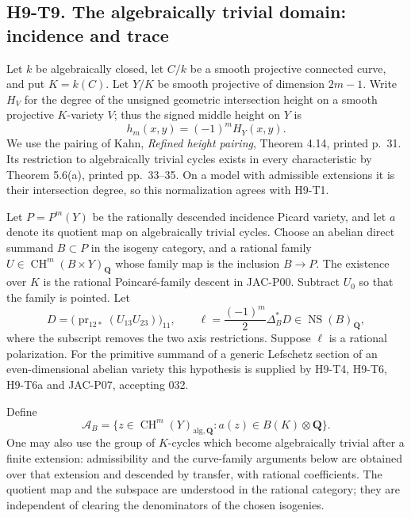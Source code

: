 
\subsection*{H9-T9. The algebraically trivial domain: incidence and trace}

Let $k$ be algebraically closed, let $C/k$ be a smooth projective connected
curve, and put $K=k(C)$. Let $Y/K$ be smooth projective of dimension
$2m-1$. Write $H_V$ for the degree of the unsigned geometric intersection
height on a smooth projective $K$-variety $V$; thus the signed middle
height on $Y$ is
\[
 h_m(x,y)=(-1)^m H_Y(x,y).
\]
We use the pairing of Kahn, \emph{Refined height pairing}, Theorem 4.14,
printed p.~31. Its restriction to algebraically trivial cycles exists in
every characteristic by Theorem 5.6(a), printed pp.~33--35. On a model
with admissible extensions it is their intersection degree, so this
normalization agrees with H9-T1.

Let $P=P^m(Y)$ be the rationally descended incidence Picard variety, and
let $a$ denote its quotient map on algebraically trivial cycles. Choose
an abelian direct summand $B\subset P$ in the isogeny category, and a
rational family $U\in\operatorname{CH}^m(B\times Y)_{\mathbf Q}$
whose family map is the inclusion $B\to P$. The existence over $K$ is
the rational Poincar\'e-family descent in JAC-P00. Subtract $U_0$ so
that the family is pointed. Let
\[
 D=\bigl(\operatorname{pr}_{12*}(U_{13}U_{23})\bigr)_{11},
 \qquad \ell=\frac{(-1)^m}{2}\Delta_B^*D
       \in\operatorname{NS}(B)_{\mathbf Q},                 \tag{H9.25}
\]
where the subscript removes the two axis restrictions. Suppose $\ell$
is a rational polarization. For the primitive summand of a generic
Lefschetz section of an even-dimensional abelian variety this hypothesis
is supplied by H9-T4, H9-T6, H9-T6a and JAC-P07, accepting 032.

Define
\[
 \mathcal A_B=
 \{z\in\operatorname{CH}^{m}(Y)_{\mathrm{alg},\mathbf Q}:
                      a(z)\in B(K)\otimes\mathbf Q\}.
\]
One may also use the group of $K$-cycles which become algebraically
trivial after a finite extension: admissibility and the curve-family
arguments below are obtained over that extension and descended by
transfer, with rational coefficients. The quotient map and the
subspace are understood in the rational category; they are independent
of clearing the denominators of the chosen isogenies.


